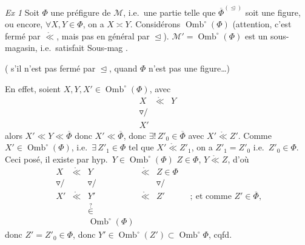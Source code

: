 \documentclass[11pt,a4paper]{article}
\begin{document}
\textit{Ex 1} Soit $\Phi$  une préfigure de $\mathcal{M}$, i.e.\ une partie telle que $\overline{\Phi}^{(\trianglelefteq)}$ soit une figure, ou encore,  $\forall X,Y\in\Phi$, on a $X\asymp Y$. Considérons $\operatorname{Omb}^{\circ}(\Phi)$ (attention, c'est fermé par $\mathring{\ll}$, mais pas en général par $\trianglelefteq$).   $\mathcal{M}'=\operatorname{Omb}^{\circ}(\Phi)$ est un sous-magasin, i.e.\ satisfait Sous-mag \struck{\ill{}}.

 ( s'il n'est pas fermé par $\trianglelefteq$, quand $\Phi$ n'est pas une figure…)

En effet, soient $X,Y,X'\in\operatorname{Omb}^{\circ}(\Phi)$, avec
\[
  \begin{array}{ccc}
    X & \mathring{\ll} & Y\\
    \triangledown\!\!/ & & \\
    X' & &
  \end{array}
\]
alors $X'\ll Y\ll\overline{\Phi}$ donc $X'\ll\overline{\Phi}$, donc $\exists!\,Z'_0\in\overline{\Phi}$ avec $X'\mathbin{\mathring{\ll}}Z'$. Comme $X'\in\operatorname{Omb}^{\circ}(\Phi)$, i.e.\ $\exists\,Z'_1\in\Phi$ tel que $X'\mathbin{\mathring{\ll}}Z'_1$, on a $Z'_1=Z'_0$ i.e.\ $Z'_0\in\Phi$. Ceci posé, il existe par hyp.\ $Y\in\operatorname{Omb}^{\circ}(\Phi)$  $Z\in\Phi$, $Y\mathbin{\mathring{\ll}}Z$, d'où
\[
  \begin{array}{ccccc}
    X & \mathring{\ll} & Y & \mathring{\ll} & Z\in\Phi\\
    \triangledown\!\!/ & & \triangledown\!\!/ & & \triangledown\!\!/\\
    X' & \mathring{\ll} & Y' & \mathring{\ll} & Z'\\
     & & \overset{?}{\in} & & \\
     & & \operatorname{Omb}^{\circ}(\Phi) & &
  \end{array}
  \quad ;\ \text{et comme } Z'\in\overline{\Phi},
\]
donc $Z'=Z'_0\in\Phi$, donc $Y'\in\operatorname{Omb}^{\circ}(Z')\subset\operatorname{Omb}^{\circ}\Phi$, cqfd.
\end{document}
